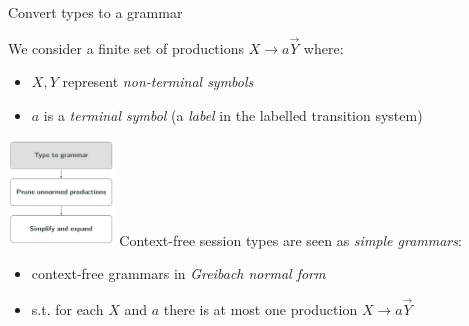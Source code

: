 \documentclass[10pt]{beamer}
\begin{document}
\begin{frame}{Convert types to a grammar}
  
  	\vspace*{-1cm}
  	\hspace*{-3mm}\parbox{8cm}{
  	\vspace*{-2.5cm}
  	  	We consider a finite set of productions $X \rightarrow a \vec Y$ where:
   	\begin{itemize}
     	\item $X, Y$ represent \emph{non-terminal symbols}
     	\item $a$ is a \emph{terminal symbol} (a \emph{label} in the labelled transition system)
   	\end{itemize}
	}\hfill\includegraphics[height=2.8cm]{img/typeToGrammar.png}
	Context-free session types are seen as \emph{simple grammars}:
  	\begin{itemize}
		\item context-free grammars in \emph{Greibach normal form} 
		\item s.t. for each $X$ and $a$ there is at most one production $X \rightarrow a \vec Y$
  	\end{itemize}
\end{frame}
\end{document}

